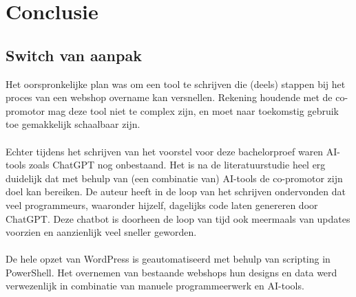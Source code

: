 
\chapter{Conclusie}%
\label{ch:conclusie}

\section{Switch van aanpak}
Het oorspronkelijke plan was om een tool te schrijven die (deels) stappen bij het proces van een webshop overname kan versnellen. Rekening houdende met de co-promotor mag deze tool niet te complex zijn, en moet naar toekomstig gebruik toe gemakkelijk schaalbaar zijn.
\\\\
Echter tijdens het schrijven van het voorstel voor deze bachelorproef waren AI-tools zoals ChatGPT nog onbestaand. Het is na de literatuurstudie heel erg duidelijk dat met behulp van (een combinatie van) AI-tools de co-promotor zijn doel kan bereiken. De auteur heeft in de loop van het schrijven ondervonden dat veel programmeurs, waaronder hijzelf, dagelijks code laten genereren door ChatGPT. Deze chatbot is doorheen de loop van tijd ook meermaals van updates voorzien en aanzienlijk veel sneller geworden. 
\\\\
De hele opzet van WordPress is geautomatiseerd met behulp van scripting in PowerShell. Het overnemen van bestaande webshops hun designs en data werd verwezenlijk in combinatie van manuele programmeerwerk en AI-tools. 

